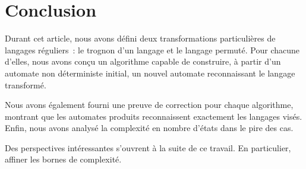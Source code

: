 \section{Conclusion}

Durant cet article, nous avons défini deux transformations particulières
de langages réguliers~: le trognon d’un langage et le langage permuté. Pour
chacune d’elles, nous avons conçu un algorithme capable de construire, à
partir d’un automate non déterministe initial, un nouvel automate
reconnaissant le langage transformé.

\vphantom{}

Nous avons également fourni une preuve de correction pour chaque algorithme,
montrant que les automates produits reconnaissent exactement les langages
visés. Enfin, nous avons analysé la complexité en nombre d’états dans le pire
des cas.

\vphantom{}

Des perspectives intéressantes s’ouvrent à la suite de ce travail. En
particulier, affiner les bornes de complexité.
